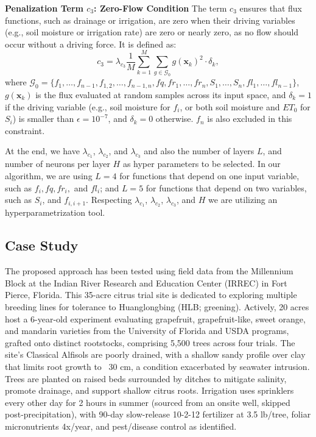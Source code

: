 \documentclass[pdflatex,sn-nature]{sn-jnl}%
\theoremstyle{thmstyleone}%
\theoremstyle{thmstyletwo}%
\theoremstyle{thmstylethree}%
\begin{document}
\textbf{Penalization Term \( c_3 \): Zero-Flow Condition}
The term \( c_3 \) ensures that flux functions, such as drainage or irrigation, are zero when their driving variables (e.g., soil moisture or irrigation rate) are zero or nearly zero, as no flow should occur without a driving force. It is defined as:
\[
c_3 = \lambda_{c_3} \frac{1}{M} \sum_{k=1}^M \sum_{g \in \mathcal{G}_0} g(\mathbf{x}_k)^2 \cdot \delta_k,
\]
where \( \mathcal{G}_0 = \{ f_1, \dots, f_{n-1}, f_{1,2}, \dots, f_{n-1,n}, fq, fr_1, \dots, fr_n, S_1, \dots, S_n, fl_1, \dots, fl_{n-1} \} \), \( g(\mathbf{x}_k) \) is the flux evaluated at random samples across its input space, and \( \delta_k = 1 \) if the driving variable (e.g., soil moisture for \( f_i \), or both soil moisture and \( ET_0 \) for \( S_i \)) is smaller than \( \epsilon = 10^{-7} \), and \( \delta_k = 0 \) otherwise. \( f_n \) is also excluded in this constraint.

At the end, we have $\lambda_{c_1}$, $\lambda_{c_2}$, and $\lambda_{c_3}$ and also the number of layers $L$, and number of neurons per layer $H$ as hyper parameters to be selected. In our algorithm, we are using $L=4$ for functions that depend on one input variable, such as $f_i, fq, fr_i,$ and $fl_i$; and $L=5$ for functions that depend on two variables, such as $S_i$, and $f_{i, i+1}$. Respecting $\lambda_{c_1}$, $\lambda_{c_2}$, $\lambda_{c_3}$, and $H$ we are utilizing an hyperparametrization tool. 


\subsection{Case Study} \label{Test Case}
The proposed approach has been tested using field data from the Millennium Block at the Indian River Research and Education Center (IRREC) in Fort Pierce, Florida. This 35-acre citrus trial site is dedicated to exploring multiple breeding lines for tolerance to Huanglongbing (HLB; greening). Actively, 20 acres host a 6-year-old experiment evaluating grapefruit, grapefruit-like, sweet orange, and mandarin varieties from the University of Florida and USDA programs, grafted onto distinct rootstocks, comprising 5,500 trees across four trials. The site's Classical Alfisols are poorly drained, with a shallow sandy profile over clay that limits root growth to ~30 cm, a condition exacerbated by seawater intrusion. Trees are planted on raised beds surrounded by ditches to mitigate salinity, promote drainage, and support shallow citrus roots. Irrigation uses sprinklers every other day for 2 hours in summer (sourced from an onsite well, skipped post-precipitation), with 90-day slow-release 10-2-12 fertilizer at 3.5 lb/tree, foliar micronutrients 4x/year, and pest/disease control as identified.
\end{document}
